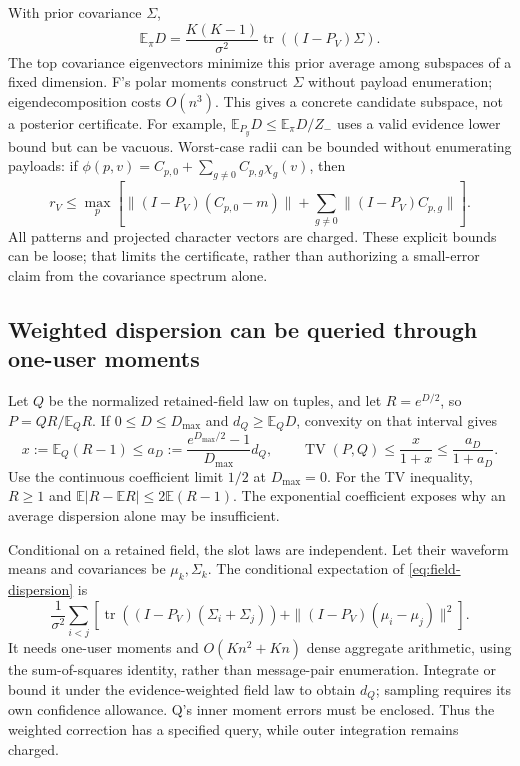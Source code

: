 \documentclass[10pt,a4paper]{article}
\newcommand{\E}{\mathbb E}
\newcommand{\TV}{\operatorname{TV}}
\begin{document}
With prior covariance $\Sigma$,
\[
 \E_\pi D=\frac{K(K-1)}{\sigma^2}
                  \operatorname{tr}((I-P_V)\Sigma).
\]
The top covariance eigenvectors minimize this prior average among subspaces of a fixed dimension.
F's polar moments construct $\Sigma$ without payload enumeration; eigendecomposition costs $O(n^3)$.
This gives a concrete candidate subspace, not a posterior certificate. For example,
$\E_{P_y}D\leq\E_\pi D/Z_-$ uses a valid evidence lower bound but can be vacuous.
Worst-case radii can be bounded without enumerating payloads: if
$\phi(p,v)=C_{p,0}+\sum_{g\ne0}C_{p,g}\chi_g(v)$, then
\[
 r_V\leq\max_p\left[
 \|(I-P_V)(C_{p,0}-m)\|+
                  \sum_{g\ne0}\|(I-P_V)C_{p,g}\|\right].
\]
All patterns and projected character vectors are charged. These explicit bounds can be loose; that
limits the certificate, rather than authorizing a small-error claim from the covariance spectrum alone.

\subsection{Weighted dispersion can be queried through one-user moments}
Let $Q$ be the normalized retained-field law on tuples, and let $R=e^{D/2}$, so $P=QR/\E_QR$.
If $0\leq D\leq D_{\max}$ and $d_Q\geq\E_QD$, convexity on that interval gives
\begin{equation}
 x:=\E_Q(R-1)\leq
 a_D:=\frac{e^{D_{\max}/2}-1}{D_{\max}}d_Q,\qquad
 \TV(P,Q)\leq\frac{x}{1+x}\leq\frac{a_D}{1+a_D}.
 \label{eq:field-weighted-dispersion}
\end{equation}
Use the continuous coefficient limit $1/2$ at $D_{\max}=0$.
For the TV inequality, $R\geq1$ and
$\E|R-\E R|\leq2\E(R-1)$.
The exponential coefficient exposes why an average dispersion alone may be insufficient.

Conditional on a retained field, the slot laws are independent. Let their waveform means and covariances
be $\mu_k,\Sigma_k$. The conditional expectation of \eqref{eq:field-dispersion} is
\[
 \frac1{\sigma^2}\sum_{i<j}
 \left[\operatorname{tr}((I-P_V)(\Sigma_i+\Sigma_j))
              +\|(I-P_V)(\mu_i-\mu_j)\|^2\right].
\]
It needs one-user moments and $O(Kn^2+Kn)$ dense aggregate arithmetic, using the sum-of-squares identity,
rather than message-pair enumeration. Integrate or bound it under the evidence-weighted field law to
obtain $d_Q$; sampling requires its own confidence allowance. Q's inner moment errors must be enclosed.
Thus the weighted correction has a specified query, while outer integration remains charged.
\end{document}
